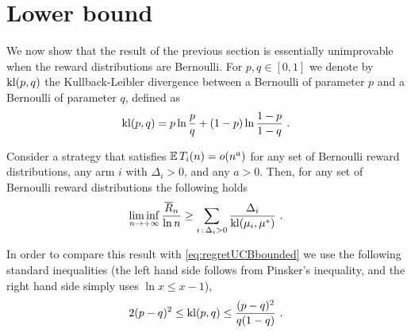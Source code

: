 \section{Lower bound}
\label{s:stoch-lower}
We now show that the result of the previous section is essentially unimprovable when the reward distributions are Bernoulli. For $p, q \in [0,1]$ we denote by $\mathrm{kl}(p,q)$ the Kullback-Leibler divergence between a Bernoulli of parameter $p$ and a Bernoulli of parameter $q$, defined as
$$\mathrm{kl}(p,q) =p \ln\frac{p}{q} + (1-p) \ln\frac{1-p}{1-q}~.$$
%
\begin{theorem} \label{th:LR85}
Consider a strategy that satisfies $\mathbb{E}\,T_i(n) = o(n^a)$ for any set of Bernoulli reward distributions, any arm $i$ with $\Delta_i > 0$, and any $a>0$. 
Then, for any set of Bernoulli reward distributions the following holds
$$\liminf_{n \to +\infty} \frac{\overline{R}_n}{\ln n} \geq \sum_{i \,:\, \Delta_i > 0} \frac{\Delta_i}{\mathrm{kl}(\mu_i,\mu^*)}~.$$
\end{theorem}
In order to compare this result with \eqref{eq:regretUCBbounded} we use the following standard inequalities (the left hand side follows from Pinsker's inequality, and the right hand side simply uses $\ln x \leq x -1$),
\begin{equation} \label{eq:klbernoullis}
2 (p-q)^2 \leq \mathrm{kl}(p,q) \leq \frac{(p-q)^2}{q(1-q)}~.
\end{equation}
%
